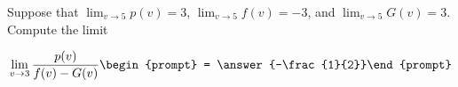 \documentclass{ximera}
\author{Matthew Carr}
\begin{document}
\begin{exercise}
Suppose that $\lim_{v\to5}p(v)=3$, $\lim_{v\to5}f(v)=-3$, and $\lim_{v\to5}G(v)=3$. Compute the limit

\[
\lim_{v\to 3 } \frac{p(v)}{f(v)-G(v)}\begin{prompt} = \answer{-\frac{1}{2}}\end{prompt}
\]
\end{exercise}
\end{document}
